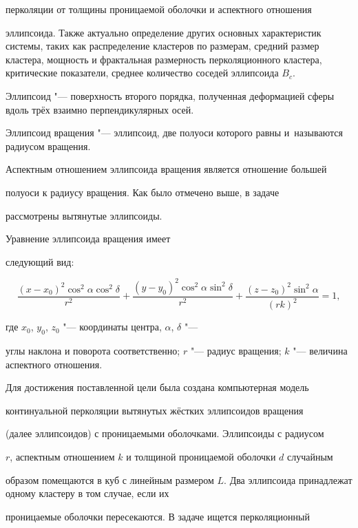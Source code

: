 перколяции от толщины проницаемой оболочки и аспектного отношения

эллипсоида. Также актуально определение других основных характеристик системы, таких как распределение кластеров по размерам, средний размер кластера, мощность и фрактальная размерность перколяционного кластера, критические показатели, среднее количество соседей эллипсоида $B_c$.



Эллипсоид "---  поверхность второго порядка, полученная деформацией сферы вдоль трёх взаимно перпендикулярных осей.

Эллипсоид вращения "---  эллипсоид, две полуоси которого равны и~называются радиусом вращения. 

Аспектным отношением эллипсоида вращения является отношение большей

полуоси к радиусу вращения. Как было отмечено выше, в задаче

рассмотрены вытянутые эллипсоиды.

Уравнение эллипсоида вращения имеет

следующий вид:

\begin{equation}\label{Eq0}

\frac{(x-x_0)^{2}\cos^{2}{\alpha}\cos^{2}{\delta}}{r^{2}}+\frac{(y-y_0)^{2}\cos^{2}{\alpha}\sin^{2}{\delta}}{r^{2}}+\frac{(z-z_0)^{2}\sin^{2}{\alpha}}{(rk)^{2}}=1,

\end{equation}

где $x_0$, $y_0$, $z_0$ "---  координаты центра, $\alpha$, $\delta$ "--- 

углы наклона и поворота соответственно; $r$ "--- радиус вращения;  $k$ "--- величина аспектного отношения.







Для достижения поставленной цели была создана компьютерная модель

континуальной перколяции вытянутых жёстких эллипсоидов вращения

(далее эллипсоидов) с проницаемыми оболочками. Эллипсоиды с радиусом

$r$, аспектным отношением $k$ и толщиной проницаемой оболочки $d$ случайным

образом помещаются в куб с линейным размером $L$. Два эллипсоида принадлежат одному кластеру в том случае, если их

проницаемые оболочки пересекаются. В задаче ищется перколяционный

